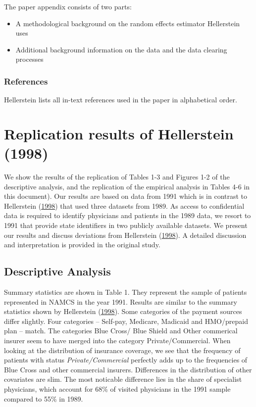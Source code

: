 \documentclass[
]{book}
\providecommand{\tightlist}{%
  \setlength{\itemsep}{0pt}\setlength{\parskip}{0pt}}
\begin{document}
The paper appendix consists of two parts:

\begin{itemize}
\tightlist
\item
  A methodological background on the random effects estimator
  Hellerstein uses
\item
  Additional background information on the data and the data clearing
  processes
\end{itemize}

\hypertarget{references}{%
\subsection{References}\label{references}}

Hellerstein lists all in-text references used in the paper in
alphabetical order.

\hypertarget{replication-results-of-hellerstein-1998}{%
\chapter{Replication results of Hellerstein
(1998)}\label{replication-results-of-hellerstein-1998}}

We show the results of the replication of Tables 1-3 and Figures 1-2 of
the descriptive analysis, and the replication of the empirical analysis
in Tables 4-6 in this document). Our results are based on data from 1991
which is in contrast to Hellerstein
(\protect\hyperlink{ref-hellerstein_importance_1998}{1998}) that used
three datasets from 1989. As access to confidential data is required to
identify physicians and patients in the 1989 data, we resort to 1991
that provide state identifiers in two publicly available datasets. We
present our results and discuss deviations from Hellerstein
(\protect\hyperlink{ref-hellerstein_importance_1998}{1998}). A detailed
discussion and interpretation is provided in the original study.

\hypertarget{descriptive-analysis}{%
\section{Descriptive Analysis}\label{descriptive-analysis}}

Summary statistics are shown in Table 1. They represent the sample of
patients represented in NAMCS in the year 1991. Results are similar to
the summary statistics shown by Hellerstein
(\protect\hyperlink{ref-hellerstein_importance_1998}{1998}). Some
categories of the payment sources differ slightly. Four categories --
Self-pay, Medicare, Madicaid and HMO/prepaid plan -- match. The
categories Blue Cross/ Blue Shield and Other commerical insurer seem to
have merged into the category Private/Commercial. When looking at the
distribution of insurance coverage, we see that the frequency of
patients with status \emph{Private/Commercial} perfectly adds up to the
frequencies of Blue Cross and other commercial insurers. Differences in
the distribution of other covariates are slim. The most noticable
difference lies in the share of specialist physicians, which account for
68\% of visited physicians in the 1991 sample compared to 55\% in 1989.
\end{document}
